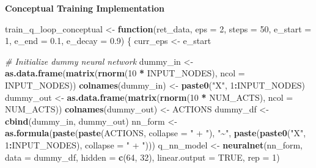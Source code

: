 \documentclass[
]{article}
\newenvironment{Shaded}{\begin{snugshade}}{\end{snugshade}}
\newcommand{\AttributeTok}[1]{\textcolor[rgb]{0.13,0.29,0.53}{#1}}
\newcommand{\CommentTok}[1]{\textcolor[rgb]{0.56,0.35,0.01}{\textit{#1}}}
\newcommand{\ConstantTok}[1]{\textcolor[rgb]{0.56,0.35,0.01}{#1}}
\newcommand{\ControlFlowTok}[1]{\textcolor[rgb]{0.13,0.29,0.53}{\textbf{#1}}}
\newcommand{\DecValTok}[1]{\textcolor[rgb]{0.00,0.00,0.81}{#1}}
\newcommand{\FloatTok}[1]{\textcolor[rgb]{0.00,0.00,0.81}{#1}}
\newcommand{\FunctionTok}[1]{\textcolor[rgb]{0.13,0.29,0.53}{\textbf{#1}}}
\newcommand{\NormalTok}[1]{#1}
\newcommand{\OtherTok}[1]{\textcolor[rgb]{0.56,0.35,0.01}{#1}}
\newcommand{\SpecialCharTok}[1]{\textcolor[rgb]{0.81,0.36,0.00}{\textbf{#1}}}
\newcommand{\StringTok}[1]{\textcolor[rgb]{0.31,0.60,0.02}{#1}}
\begin{document}
\textbf{Conceptual Training Implementation}

\begin{Shaded}
\begin{Highlighting}[]
\NormalTok{train\_q\_loop\_conceptual }\OtherTok{\textless{}{-}} \ControlFlowTok{function}\NormalTok{(ret\_data, }\AttributeTok{eps =} \DecValTok{2}\NormalTok{, }\AttributeTok{steps =} \DecValTok{50}\NormalTok{, }\AttributeTok{e\_start =} \DecValTok{1}\NormalTok{, }\AttributeTok{e\_end =} \FloatTok{0.1}\NormalTok{, }\AttributeTok{e\_decay =} \FloatTok{0.9}\NormalTok{) \{}
\NormalTok{  curr\_eps }\OtherTok{\textless{}{-}}\NormalTok{ e\_start}
  
  \CommentTok{\# Initialize dummy neural network}
\NormalTok{  dummy\_in }\OtherTok{\textless{}{-}} \FunctionTok{as.data.frame}\NormalTok{(}\FunctionTok{matrix}\NormalTok{(}\FunctionTok{rnorm}\NormalTok{(}\DecValTok{10} \SpecialCharTok{*}\NormalTok{ INPUT\_NODES), }\AttributeTok{ncol =}\NormalTok{ INPUT\_NODES))}
  \FunctionTok{colnames}\NormalTok{(dummy\_in) }\OtherTok{\textless{}{-}} \FunctionTok{paste0}\NormalTok{(}\StringTok{"X"}\NormalTok{, }\DecValTok{1}\SpecialCharTok{:}\NormalTok{INPUT\_NODES)}
\NormalTok{  dummy\_out }\OtherTok{\textless{}{-}} \FunctionTok{as.data.frame}\NormalTok{(}\FunctionTok{matrix}\NormalTok{(}\FunctionTok{rnorm}\NormalTok{(}\DecValTok{10} \SpecialCharTok{*}\NormalTok{ NUM\_ACTS), }\AttributeTok{ncol =}\NormalTok{ NUM\_ACTS))}
  \FunctionTok{colnames}\NormalTok{(dummy\_out) }\OtherTok{\textless{}{-}}\NormalTok{ ACTIONS}
\NormalTok{  dummy\_df }\OtherTok{\textless{}{-}} \FunctionTok{cbind}\NormalTok{(dummy\_in, dummy\_out)}
\NormalTok{  nn\_form }\OtherTok{\textless{}{-}} \FunctionTok{as.formula}\NormalTok{(}\FunctionTok{paste}\NormalTok{(}\FunctionTok{paste}\NormalTok{(ACTIONS, }\AttributeTok{collapse =} \StringTok{" + "}\NormalTok{), }\StringTok{"\textasciitilde{}"}\NormalTok{, }\FunctionTok{paste}\NormalTok{(}\FunctionTok{paste0}\NormalTok{(}\StringTok{"X"}\NormalTok{, }\DecValTok{1}\SpecialCharTok{:}\NormalTok{INPUT\_NODES), }\AttributeTok{collapse =} \StringTok{" + "}\NormalTok{)))}
\NormalTok{  q\_nn\_model }\OtherTok{\textless{}{-}} \FunctionTok{neuralnet}\NormalTok{(nn\_form, }\AttributeTok{data =}\NormalTok{ dummy\_df, }\AttributeTok{hidden =} \FunctionTok{c}\NormalTok{(}\DecValTok{64}\NormalTok{, }\DecValTok{32}\NormalTok{), }\AttributeTok{linear.output =} \ConstantTok{TRUE}\NormalTok{, }\AttributeTok{rep =} \DecValTok{1}\NormalTok{)}
  

\end{Highlighting}
\end{Shaded}
\end{document}
